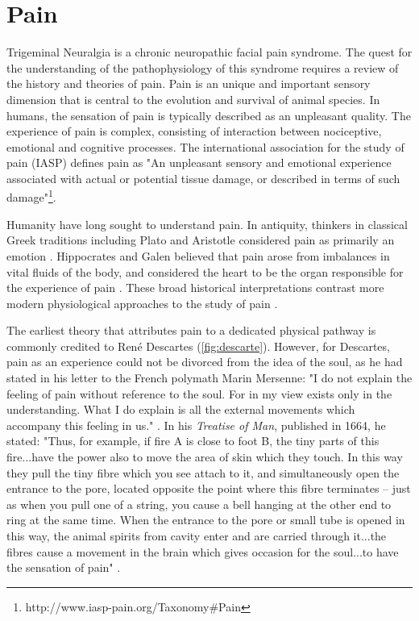 \section{Pain}

Trigeminal Neuralgia is a chronic neuropathic facial pain syndrome. The quest for the understanding of the pathophysiology of this syndrome requires a review of the history and theories of pain. Pain is an unique and important sensory dimension that is central to the evolution and survival of animal species. In humans, the sensation of pain is typically described as an unpleasant quality. The experience of pain is complex, consisting of interaction between nociceptive, emotional and cognitive processes. The international association for the study of pain (IASP) defines pain as "An unpleasant sensory and emotional experience associated with actual or potential tissue damage, or described in terms of such damage"\footnote{http://www.iasp-pain.org/Taxonomy\#Pain}. 

Humanity have long sought to understand pain. In antiquity, thinkers in classical Greek traditions including Plato and Aristotle considered pain as primarily an emotion \cite{Moayedi2012a}. Hippocrates and Galen believed that pain arose from imbalances in vital fluids of the body, and considered the heart to be the organ responsible for the experience of pain \cite{Melzack1999}. These broad historical interpretations contrast more modern physiological approaches to the study of pain \cite{Melzack1999,Moayedi2012a}.

The earliest theory that attributes pain to a dedicated physical pathway is commonly credited to Ren\'{e} Descartes (\ref{fig:descarte}). However, for Descartes, pain as an experience  could not be divorced from the idea of the soul, as he had stated in his letter to the French polymath Marin Mersenne: "I do not explain the feeling of pain without reference to the soul. For in my view exists only in the understanding. What I do explain is all the external movements which accompany this feeling in us." \cite[p. 148]{BookCottingham1991v3}. In his \textit{Treatise of Man}, published in 1664, he stated: "Thus, for example, if fire A is close to foot B, the tiny parts of this fire...have the power also to move the area of skin which they touch. In this way they pull the tiny fibre which you see attach to it, and simultaneously open the entrance to the pore, located opposite the point where this fibre terminates -- just as when you pull one of a string, you cause a bell hanging at the other end to ring at the same time. When the entrance to the pore or small tube is opened in this way, the animal spirits from cavity enter and are carried through it...the fibres cause a movement in the brain which gives occasion for the soul...to have the sensation of pain" \cite[p.101-103]{BookCottingham1991v1}.

